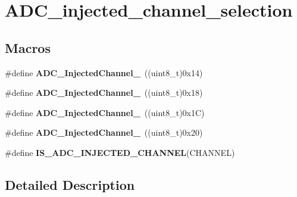 \hypertarget{group___a_d_c__injected__channel__selection}{}\section{A\+D\+C\+\_\+injected\+\_\+channel\+\_\+selection}
\label{group___a_d_c__injected__channel__selection}
\subsection*{Macros}
\begin{DoxyCompactItemize}
\item 
\hypertarget{group___a_d_c__injected__channel__selection_ga8792d4ae0fa82dd317252c72815684ba}{}\#define {\bfseries A\+D\+C\+\_\+\+Injected\+Channel\+\_}~((uint8\+\_\+t)0x14)\label{group___a_d_c__injected__channel__selection_ga8792d4ae0fa82dd317252c72815684ba}

\item 
\hypertarget{group___a_d_c__injected__channel__selection_ga2e322fccc7de16a0e79be573f5b1211c}{}\#define {\bfseries A\+D\+C\+\_\+\+Injected\+Channel\+\_}~((uint8\+\_\+t)0x18)\label{group___a_d_c__injected__channel__selection_ga2e322fccc7de16a0e79be573f5b1211c}

\item 
\hypertarget{group___a_d_c__injected__channel__selection_ga6bf03d805645b942bdcc53504e772cf1}{}\#define {\bfseries A\+D\+C\+\_\+\+Injected\+Channel\+\_}~((uint8\+\_\+t)0x1\+C)\label{group___a_d_c__injected__channel__selection_ga6bf03d805645b942bdcc53504e772cf1}

\item 
\hypertarget{group___a_d_c__injected__channel__selection_ga31d18bbcfa7b685e90c3a1313d9c6406}{}\#define {\bfseries A\+D\+C\+\_\+\+Injected\+Channel\+\_}~((uint8\+\_\+t)0x20)\label{group___a_d_c__injected__channel__selection_ga31d18bbcfa7b685e90c3a1313d9c6406}

\item 
\#define {\bfseries I\+S\+\_\+\+A\+D\+C\+\_\+\+I\+N\+J\+E\+C\+T\+E\+D\+\_\+\+C\+H\+A\+N\+N\+E\+L}(C\+H\+A\+N\+N\+E\+L)
\end{DoxyCompactItemize}


\subsection{Detailed Description}


